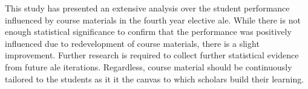 This study has presented an extensive analysis over the student performance influenced by course materials in the fourth year elective \acrshort{ale}. 
While there is not enough statistical significance to confirm that the performance was positively influenced due to redevelopment of course materials, there is a slight improvement. 
Further research is required to collect further statistical evidence from future \acrshort{ale} iterations. 
Regardless, course material should be continuously tailored to the students as it it the canvas to which scholars build their learning.